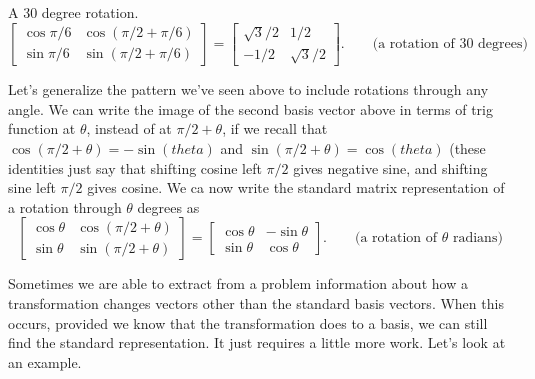 \begin{example}
{A 30 degree rotation.}
$$
\begin{bmatrix}
\cos \pi/6&\cos(\pi/2+\pi/6)\\
\sin\pi/6&\sin(\pi/2+\pi/6)
\end{bmatrix}
=\begin{bmatrix}\sqrt3/2&1/2\\-1/2&\sqrt3/2\end{bmatrix}. \quad\quad \text{(a rotation of 30 degrees)}$$  

\end{example}

Let's generalize the pattern we've seen above to include rotations through any angle. We can write the image of the second basis vector above in terms of trig function at $\theta$, instead of at $\pi/2+\theta$, if we recall that $\cos(\pi/2+\theta) = -\sin(theta)$ and $\sin(\pi/2+\theta) = \cos(theta)$ (these identities just say that shifting cosine left $\pi/2$ gives negative sine, and shifting sine left $\pi/2$ gives cosine.  
We ca now write the standard matrix representation of a rotation through $\theta$ degrees as
$$
\begin{bmatrix}
\cos \theta&\cos(\pi/2+\theta)\\
\sin \theta&\sin(\pi/2+\theta)
\end{bmatrix}
=
\begin{bmatrix}
\cos \theta&-\sin\theta\\
\sin \theta&\cos\theta
\end{bmatrix}.
\quad\quad \text{(a rotation of $\theta$ radians)}
$$




Sometimes we are able to extract from a problem information about how a transformation changes vectors other than the standard basis vectors.  When this occurs, provided we know that the transformation does to a basis, we can still find the standard representation. It just requires a little more work. Let's look at an example. 

